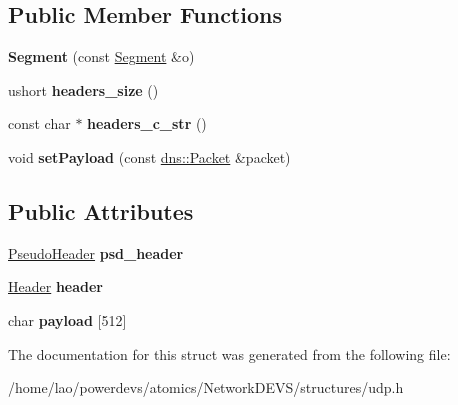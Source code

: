 \subsection*{Public Member Functions}
\begin{DoxyCompactItemize}
\item 
{\bfseries Segment} (const \hyperlink{structudp_1_1Segment}{Segment} \&o)\hypertarget{structudp_1_1Segment_acc1762aaf9872190d9021a574123122c}{}\label{structudp_1_1Segment_acc1762aaf9872190d9021a574123122c}

\item 
ushort {\bfseries headers\+\_\+size} ()\hypertarget{structudp_1_1Segment_ad3b9b073288d5aa58c503caa76c6481b}{}\label{structudp_1_1Segment_ad3b9b073288d5aa58c503caa76c6481b}

\item 
const char $\ast$ {\bfseries headers\+\_\+c\+\_\+str} ()\hypertarget{structudp_1_1Segment_a0e04a50568add9be05b2f4b6bd93fd13}{}\label{structudp_1_1Segment_a0e04a50568add9be05b2f4b6bd93fd13}

\item 
void {\bfseries set\+Payload} (const \hyperlink{structdns_1_1Packet}{dns\+::\+Packet} \&packet)\hypertarget{structudp_1_1Segment_abe03349ffcc6719961fdc447d930dd37}{}\label{structudp_1_1Segment_abe03349ffcc6719961fdc447d930dd37}

\end{DoxyCompactItemize}
\subsection*{Public Attributes}
\begin{DoxyCompactItemize}
\item 
\hyperlink{structudp_1_1PseudoHeader}{Pseudo\+Header} {\bfseries psd\+\_\+header}\hypertarget{structudp_1_1Segment_a56820c56012f0171ee1eb6015b26cafe}{}\label{structudp_1_1Segment_a56820c56012f0171ee1eb6015b26cafe}

\item 
\hyperlink{structudp_1_1Header}{Header} {\bfseries header}\hypertarget{structudp_1_1Segment_a835a6997845d3f83c668ac6fd8faa880}{}\label{structudp_1_1Segment_a835a6997845d3f83c668ac6fd8faa880}

\item 
char {\bfseries payload} \mbox{[}512\mbox{]}\hypertarget{structudp_1_1Segment_a93987612417850d7e464a9062dfb0789}{}\label{structudp_1_1Segment_a93987612417850d7e464a9062dfb0789}

\end{DoxyCompactItemize}


The documentation for this struct was generated from the following file\+:\begin{DoxyCompactItemize}
\item 
/home/lao/powerdevs/atomics/\+Network\+D\+E\+V\+S/structures/udp.\+h\end{DoxyCompactItemize}
